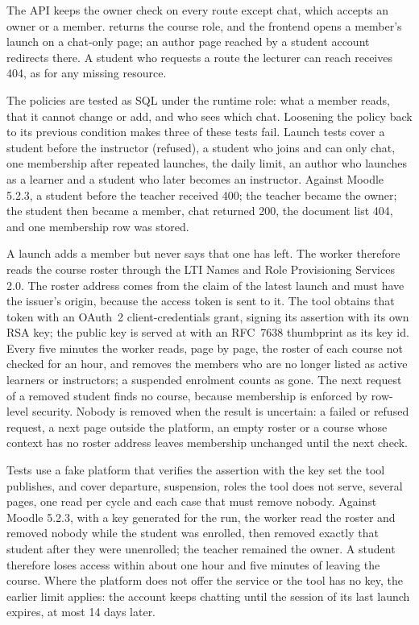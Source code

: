 The API keeps the owner check on every route except chat, which accepts an owner or a member.  returns the course role, and the frontend opens a member's launch on a chat-only page; an author page reached by a student account redirects there. A student who requests a route the lecturer can reach receives 404, as for any missing resource.

The policies are tested as SQL under the runtime role: what a member reads, that it cannot change or add, and who sees which chat. Loosening the  policy back to its previous condition makes three of these tests fail. Launch tests cover a student before the instructor (refused), a student who joins and can only chat, one membership after repeated launches, the daily limit, an author who launches as a learner and a student who later becomes an instructor. Against Moodle 5.2.3, a student before the teacher received 400; the teacher became the owner; the student then became a member, chat returned 200, the document list 404, and one membership row was stored.

A launch adds a member but never says that one has left. The worker therefore reads the course roster through the LTI Names and Role Provisioning Services 2.0. The roster address comes from the  claim of the latest launch and must have the issuer's origin, because the access token is sent to it. The tool obtains that token with an OAuth~2 client-credentials grant, signing its assertion with its own RSA key; the public key is served at  with an RFC~7638 thumbprint as its key id. Every five minutes the worker reads, page by page, the roster of each course not checked for an hour, and removes the members who are no longer listed as active learners or instructors; a suspended enrolment counts as gone. The next request of a removed student finds no course, because membership is enforced by row-level security. Nobody is removed when the result is uncertain: a failed or refused request, a next page outside the platform, an empty roster or a course whose context has no roster address leaves membership unchanged until the next check.

Tests use a fake platform that verifies the assertion with the key set the tool publishes, and cover departure, suspension, roles the tool does not serve, several pages, one read per cycle and each case that must remove nobody. Against Moodle 5.2.3, with a key generated for the run, the worker read the roster and removed nobody while the student was enrolled, then removed exactly that student after they were unenrolled; the teacher remained the owner. A student therefore loses access within about one hour and five minutes of leaving the course. Where the platform does not offer the service or the tool has no key, the earlier limit applies: the account keeps chatting until the session of its last launch expires, at most 14 days later.
